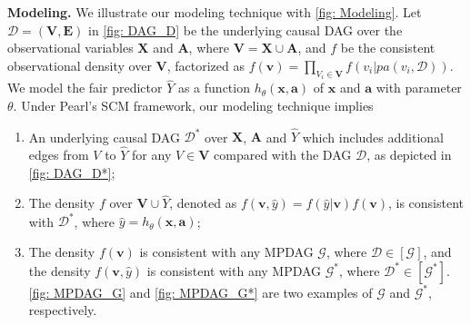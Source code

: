 \documentclass{article} %
\begin{document}
\textbf{Modeling.} We illustrate our modeling technique with \cref{fig: Modeling}. Let $\mathcal{D}=(\mathbf{V}, \mathbf{E})$ in \cref{fig: DAG_D} be the underlying causal DAG over the observational variables $\mathbf{X}$ and $\mathbf{A}$, where $\mathbf{V} = \mathbf{X} \cup \mathbf{A}$, and $f$ be the consistent observational density over $\mathbf{V}$, factorized as $f(\mathbf{v})=\prod_{V_{i} \in \mathbf{V}} f(v_{i}|pa(v_{i}, \mathcal{D}))$. We model the fair predictor $\hat{Y}$ as a function $h_{\theta}(\mathbf{x}, \mathbf{a})$ of $\mathbf{x}$ and $\mathbf{a}$ with parameter $\theta$. Under Pearl's SCM framework, our modeling technique implies 
\begin{enumerate}
    \item An underlying causal DAG $\mathcal{D^*}$ over $\mathbf{X}$, $\mathbf{A}$ and $\hat{Y}$ which includes additional edges from $V$ to $\hat{Y}$ for any $V \in \mathbf{V}$ compared with the DAG $\mathcal{D}$, as depicted in \cref{fig: DAG_D*};
    \item The density $f$ over $\mathbf{V} \cup \hat{Y}$, denoted as $f(\mathbf{v}, \hat{y})=f(\hat{y}|\mathbf{v})f(\mathbf{v})$, is consistent with $\mathcal{D^*}$, where $\hat{y}=h_{\theta}(\mathbf{x}, \mathbf{a})$;
    \item The density $f(\mathbf{v})$ is consistent with any MPDAG $\mathcal{G}$, where $\mathcal{D} \in [\mathcal{G}]$, and the density $f(\mathbf{v}, \hat{y})$ is consistent with any MPDAG $\mathcal{G^*}$, where $\mathcal{D^*} \in [\mathcal{G^*}]$. \cref{fig: MPDAG_G} and \cref{fig: MPDAG_G*} are two examples of $\mathcal{G}$ and $\mathcal{G^*}$, respectively.
\end{enumerate}
\end{document}
